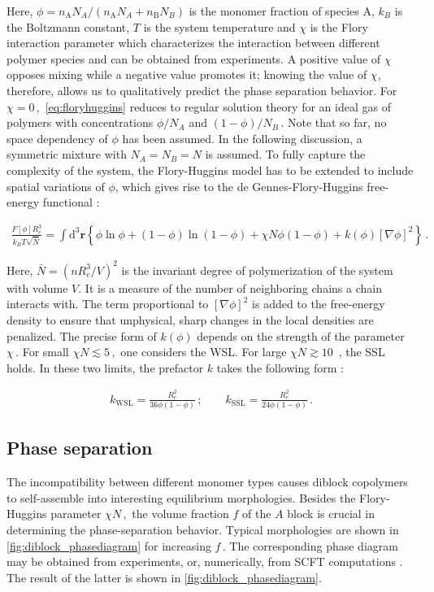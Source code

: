 \documentclass[bachelor,       %
               twoside,        %
               BCOR10mm,       %
               ngerman, english %
               ]{GAUBM}
\begin{document}
Here, $\phi=n_\mathrm AN_A/(n_\mathrm AN_A+n_\mathrm BN_B)$ is the monomer fraction of species A, $k_B$ is the Boltzmann constant, $T$ is the system temperature and $\chi$ is the Flory interaction parameter which characterizes the interaction between different polymer species and can be obtained from experiments. A positive value of $\chi$ opposes mixing while a negative value promotes it; knowing the value of $\chi$, therefore, allows us to qualitatively predict the phase separation behavior. For $\chi=0\,,$ \eqref{eq:floryhuggins} reduces to regular solution theory for an ideal gas of polymers with concentrations $\phi/N_A$ and $(1-\phi)/N_B\,.$  Note that so far, no space dependency of $\phi$ has been assumed. In the following discussion, a symmetric mixture with $N_A=N_B=N$ is assumed. To fully capture the complexity of the system, the Flory-Huggins model has to be extended to include spatial variations of $\phi$, which gives rise to the de Gennes-Flory-Huggins free-energy functional  \cite{deGennes80, Reister02}:


\begin{align}
  \frac{F[\phi]R_e^3}{k_BT\sqrt{\bar N}}=\int \mathrm{d}^3\mathbf{r}\left\{\phi\ln\phi+(1-\phi)\ln(1-\phi)+\chi N\phi(1-\phi)+k(\phi)[\nabla\phi]^2\right\}\,.
  \label{eq:flory_fctl}
\end{align}

Here, $\bar N=\left(nR_e^3/V\right)^2$ is the invariant degree of polymerization of the system with volume $V$. It is a measure of the number of neighboring chains a chain interacts with. The term proportional to $[\nabla\phi]^2$ is added to the free-energy density to ensure that unphysical, sharp changes in the local densities are penalized. The precise form of $k(\phi)$ depends on the strength of the parameter $\chi\,$. For small $\chi N\lesssim 5\,,$ one considers the \ac{WSL}. For large $\chi N\gtrsim10\,$ \cite{Semenov1996Dec}, the \ac{SSL} holds. In these two limits, the prefactor $k$ takes the following form \cite{Reister02}:

\begin{align}
  k_\mathrm{WSL}=\frac{R_e^2}{36\phi(1-\phi)}\,;\qquad k_\mathrm{SSL}=\frac{R_e^2}{24\phi(1-\phi)}\,.
\end{align}

\subsection{Phase separation}

The incompatibility between different monomer types causes diblock copolymers to self-assemble into interesting equilibrium morphologies. Besides the Flory-Huggins parameter $\chi N\,,$ the volume fraction $f$ of the $A$ block is crucial in determining the phase-separation behavior. Typical morphologies are shown in \ref{fig:diblock_phasediagram} for increasing $f\,.$ The corresponding phase diagram may be obtained from experiments, or, numerically, from \ac{SCFT} computations \cite{matsen_copolymer}. The result of the latter is shown in \ref{fig:diblock_phasediagram}.
\end{document}
